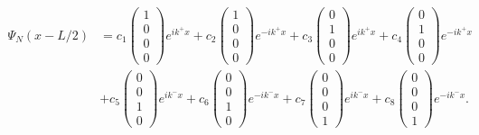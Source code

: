 \begin{equation}
\begin{split}
\Psi_N(x-L/2) &= 
c_1
\begin{pmatrix}
1 \\ 0 \\ 0 \\ 0
\end{pmatrix}e^{ik^+x}
+
c_2
\begin{pmatrix}
1 \\ 0 \\ 0 \\ 0
\end{pmatrix}e^{-ik^+x}
+
c_3
\begin{pmatrix}
0 \\ 1 \\ 0 \\ 0
\end{pmatrix}e^{ik^+x}
+
c_4
\begin{pmatrix}
0 \\ 1 \\ 0 \\ 0
\end{pmatrix}e^{-ik^+x}
\\&+
c_5
\begin{pmatrix}
0 \\ 0 \\ 1 \\ 0
\end{pmatrix}e^{ik^-x}
+
c_6
\begin{pmatrix}
0 \\ 0 \\ 1 \\ 0
\end{pmatrix}e^{-ik^-x}
+
c_7
\begin{pmatrix}
0 \\ 0 \\ 0 \\ 1
\end{pmatrix}e^{ik^-x}
+
c_8
\begin{pmatrix}
0 \\ 0 \\ 0 \\ 1
\end{pmatrix}e^{-ik^-x}.
\end{split}
\end{equation}

